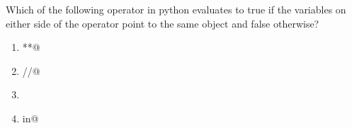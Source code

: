 \question
Which of the following operator in python evaluates to true if the variables on either side of the operator point to the same object and false otherwise?

\begin{enumerate}
\item \lstinline@**@
\item \lstinline@//@
\item \lstinline@is@
\item \lstinline@not in@
\end{enumerate}

